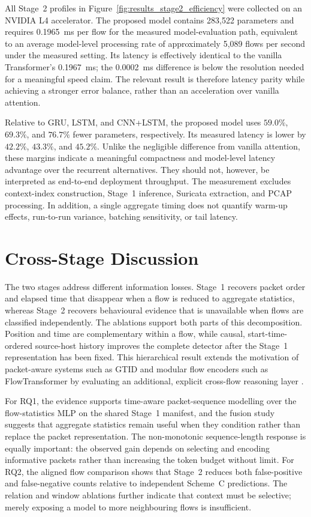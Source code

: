 \documentclass[11pt,fleqn]{report}
\begin{document}
All Stage~2 profiles in Figure~\ref{fig:results_stage2_efficiency} were collected on an NVIDIA L4 accelerator. The proposed model contains 283,522 parameters and requires 0.1965~ms per flow for the measured model-evaluation path, equivalent to an average model-level processing rate of approximately 5,089 flows per second under the measured setting. Its latency is effectively identical to the vanilla Transformer's 0.1967~ms; the 0.0002~ms difference is below the resolution needed for a meaningful speed claim. The relevant result is therefore latency parity while achieving a stronger error balance, rather than an acceleration over vanilla attention.

Relative to GRU, LSTM, and CNN+LSTM, the proposed model uses $59.0\%$, $69.3\%$, and $76.7\%$ fewer parameters, respectively. Its measured latency is lower by $42.2\%$, $43.3\%$, and $45.2\%$. Unlike the negligible difference from vanilla attention, these margins indicate a meaningful compactness and model-level latency advantage over the recurrent alternatives. They should not, however, be interpreted as end-to-end deployment throughput. The measurement excludes context-index construction, Stage~1 inference, Suricata extraction, and PCAP processing. In addition, a single aggregate timing does not quantify warm-up effects, run-to-run variance, batching sensitivity, or tail latency.

\section{Cross-Stage Discussion}
\label{subsec:results_cross_stage_discussion}

The two stages address different information losses. Stage~1 recovers packet order and elapsed time that disappear when a flow is reduced to aggregate statistics, whereas Stage~2 recovers behavioural evidence that is unavailable when flows are classified independently. The ablations support both parts of this decomposition. Position and time are complementary within a flow, while causal, start-time-ordered source-host history improves the complete detector after the Stage~1 representation has been fixed. This hierarchical result extends the motivation of packet-aware systems such as GTID and modular flow encoders such as FlowTransformer by evaluating an additional, explicit cross-flow reasoning layer \cite{Han2023GTID,Manocchio2024FlowTransformer}.

For RQ1, the evidence supports time-aware packet-sequence modelling over the flow-statistics MLP on the shared Stage~1 manifest, and the fusion study suggests that aggregate statistics remain useful when they condition rather than replace the packet representation. The non-monotonic sequence-length response is equally important: the observed gain depends on selecting and encoding informative packets rather than increasing the token budget without limit. For RQ2, the aligned flow comparison shows that Stage~2 reduces both false-positive and false-negative counts relative to independent Scheme~C predictions. The relation and window ablations further indicate that context must be selective; merely exposing a model to more neighbouring flows is insufficient.
\end{document}
